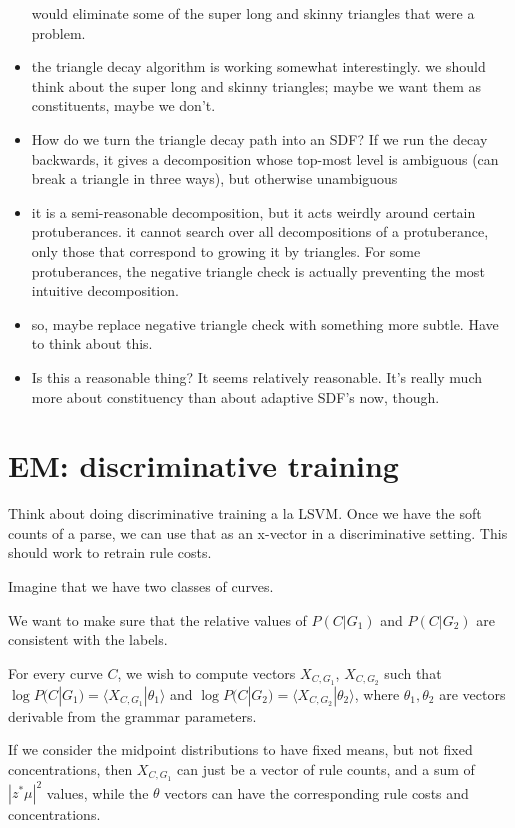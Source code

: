 \documentclass{book}
\begin{document}
\begin{itemize}
    would eliminate some of the super long and skinny triangles that
    were a problem.
\item the triangle decay algorithm is working somewhat interestingly. we
    should think about the super long and skinny triangles; maybe we
    want them as constituents, maybe we don't.
\item How do we turn the triangle decay path into an SDF? If we run the
    decay backwards, it gives a decomposition whose top-most level is
    ambiguous (can break a triangle in three ways), but otherwise
    unambiguous
\item it is a semi-reasonable decomposition, but it acts weirdly around
    certain protuberances. it cannot search over all decompositions of
    a protuberance, only those that correspond to growing it by
    triangles. For some protuberances, the negative triangle check is
    actually preventing the most intuitive decomposition.
\item so, maybe replace negative triangle check with something more
    subtle. Have to think about this.
\item Is this a reasonable thing? It seems relatively reasonable. It's
    really much more about constituency than about adaptive SDF's now,
    though.
\end{itemize}
\section{EM: discriminative training}
\label{sec-5_5}

Think about doing discriminative training a la LSVM. Once we have the
soft counts of a parse, we can use that as an x-vector in a
discriminative setting. This should work to retrain rule costs.

Imagine that we have two classes of curves.

We want to make sure that the relative values of $P(C|G_1)$ and
$P(C|G_2)$ are consistent with the labels.

For every curve $C$, we wish to compute vectors $X_{C, G_1}$, $X_{C,
G_2}$ such that $\log P(C|G_1) = \langle X_{C, G_1} | \theta_1 \rangle$ and
$\log P(C|G_2) = \langle X_{C, G_2} | \theta_2 \rangle$, where $\theta_1,
\theta_2$ are vectors derivable from the grammar parameters.

If we consider the midpoint distributions to have fixed means, but not
fixed concentrations, then $X_{C, G_1}$ can just be a vector of rule
counts, and a sum of $|z^* \mu|^2$ values, while the $\theta$ vectors
can have the corresponding rule costs and concentrations.
\end{document}
